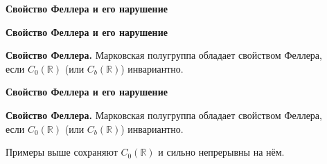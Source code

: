 \documentclass[11pt]{article}
\newcommand{\R}{\mathbb{R}}
\begin{document}
\newpage

\begin{center}
{\color{notaeYELLOW}\bfseries\fontsize{44}{52}\selectfont Свойство Феллера и его нарушение}
\end{center}
\vspace*{\fill}
\begin{center}
\fontsize{36}{43}\selectfont
\end{center}
\vspace*{\fill}

\newpage

\begin{center}
{\color{notaeYELLOW}\bfseries\fontsize{44}{52}\selectfont Свойство Феллера и его нарушение}
\end{center}
\vspace*{\fill}
\begin{center}
\fontsize{36}{43}\selectfont
\parbox{\linewidth}{\centering\noindent \textbf{Свойство Феллера.} Марковская полугруппа обладает свойством Феллера,\\ если $C_0(\R)$ (или $C_b(\R)$) инвариантно.
\par}\vspace{0.4in}
\end{center}
\vspace*{\fill}

\newpage

\begin{center}
{\color{notaeYELLOW}\bfseries\fontsize{44}{52}\selectfont Свойство Феллера и его нарушение}
\end{center}
\vspace*{\fill}
\begin{center}
\fontsize{36}{43}\selectfont
\parbox{\linewidth}{\centering\noindent \textbf{Свойство Феллера.} Марковская полугруппа обладает свойством Феллера,\\ если $C_0(\R)$ (или $C_b(\R)$) инвариантно.
\par}\vspace{0.4in}
\parbox{\linewidth}{\centering\noindent Примеры выше сохраняют $C_0(\R)$ и сильно непрерывны на нём.
\par}\vspace{0.4in}
\end{center}
\vspace*{\fill}

\newpage
\end{document}
